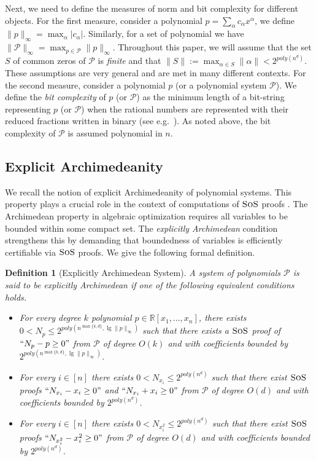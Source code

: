 \documentclass[11pt]{article}
\newcommand{\sos}{\text{\sc{SoS}}}
\newcommand{\1}{\textbf{1}}
\newtheorem{definition}[theorem]{Definition}
\begin{document}
Next, we need to define the measures of norm and bit complexity for different objects. For the first measure, consider a polynomial $p = \sum_\alpha c_\alpha x^\alpha$, we define $\| p \|_{\infty} = \max_\alpha |c_{\alpha}|$. Similarly, for a set of polynomial we have $\| \mathcal{P} \|_{\infty} = \max_{p \in \mathcal{P}} \| p \|_{\infty}$. Throughout this paper, we will assume that the set $S$ of common zeros of $\mathcal P$ is \textit{finite} and that  $\| S \| := \max_{\alpha \in S} \| \alpha \| < 2^{poly(n^d)}$. These assumptions are very general and are met in many different contexts. For the second measure, consider a polynomial $p$ (or a polynomial system $\mathcal{P}$). We define the \emph{bit complexity} of $p$ (or $\mathcal{P}$) as the minimum length of a bit-string representing $p$ (or $\mathcal{P}$) when the rational numbers are represented with their reduced fractions written in binary (see e.g.~\cite{Hakoniemi21}). As noted above, the bit complexity of $\mathcal{P}$ is assumed polynomial in $n$.

\subsection*{Explicit Archimedeanity}

We recall the notion of explicit Archimedeanity of polynomial systems. This property plays a crucial role in the context of computations of $\sos$ proofs \cite{JoszH16,Laurent2009}. The Archimedean property in algebraic optimization requires all variables to be bounded within some compact set. The \emph{explicitly Archimedean} condition strengthens this by demanding that boundedness of variables is efficiently certifiable via $\sos$ proofs. We give the following formal definition.

\begin{definition}[Explicitly Archimedean System]
    A system of polynomials $\mathcal{P}$ is said to be \emph{explicitly Archimedean} if one of the following equivalent conditions holds.
    \begin{itemize}
        \item \label{def:exp_arch} For every degree $k$ polynomial $p\in \mathbb{R}[x_1, \dots, x_n]$, there exists $0<N_p \leq 2^{poly(n^{\max\{k,d\}}, \lg \|p\|_{\infty})}$ such that there exists a $\sos$ proof of $``N_p-p\geq 0"$ from $\mathcal{P}$ of degree $O(k)$ and with coefficients bounded by $2^{poly(n^{\max\{k,d\}}, \lg \|p\|_{\infty})}$.
        \item \label{prop:bounded_variables_archimedeanity} For every $i \in [n]$ there exists $0 < N_{x_i} \leq 2^{poly(n^d)}$ such that there exist $\sos$ proofs $``N_{x_i} - x_i \geq 0"$ and $``N_{x_i} + x_i \geq 0"$ from $\mathcal{P}$ of degree $O(d)$ and with coefficients bounded by $2^{poly(n^d)}$.
        \item For every $i \in [n]$ there exists $0 < N_{x_i^2} \leq 2^{poly(n^d)}$ such that there exist $\sos$ proofs $``N_{x_i^2} - x_i^2 \geq 0"$ from $\mathcal{P}$ of degree $O(d)$ and with coefficients bounded by $2^{poly(n^d)}$.
    \end{itemize}
\end{definition}
\end{document}
